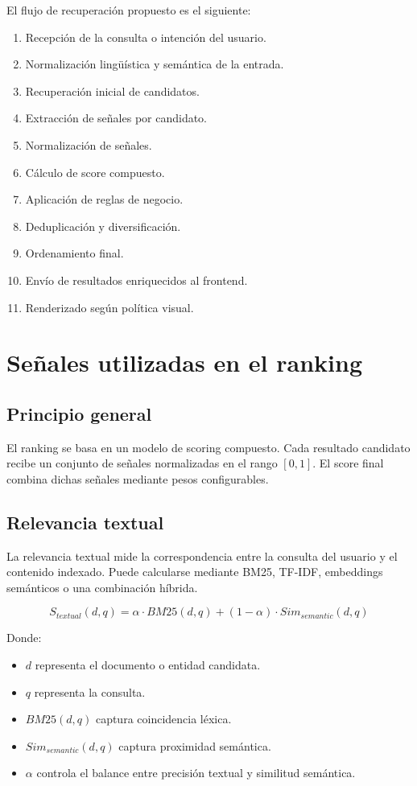 \documentclass[12pt,a4paper]{article}
\begin{document}
El flujo de recuperación propuesto es el siguiente:

\begin{enumerate}[noitemsep]
    \item Recepción de la consulta o intención del usuario.
    \item Normalización lingüística y semántica de la entrada.
    \item Recuperación inicial de candidatos.
    \item Extracción de señales por candidato.
    \item Normalización de señales.
    \item Cálculo de score compuesto.
    \item Aplicación de reglas de negocio.
    \item Deduplicación y diversificación.
    \item Ordenamiento final.
    \item Envío de resultados enriquecidos al frontend.
    \item Renderizado según política visual.
\end{enumerate}

\section{Señales utilizadas en el ranking}

\subsection{Principio general}

El ranking se basa en un modelo de scoring compuesto. Cada resultado candidato recibe un conjunto de señales normalizadas en el rango $[0,1]$. El score final combina dichas señales mediante pesos configurables.

\subsection{Relevancia textual}

La relevancia textual mide la correspondencia entre la consulta del usuario y el contenido indexado. Puede calcularse mediante BM25, TF-IDF, embeddings semánticos o una combinación híbrida.

\[
S_{textual}(d,q) = \alpha \cdot BM25(d,q) + (1-\alpha) \cdot Sim_{semantic}(d,q)
\]

Donde:

\begin{itemize}[noitemsep]
    \item $d$ representa el documento o entidad candidata.
    \item $q$ representa la consulta.
    \item $BM25(d,q)$ captura coincidencia léxica.
    \item $Sim_{semantic}(d,q)$ captura proximidad semántica.
    \item $\alpha$ controla el balance entre precisión textual y similitud semántica.
\end{itemize}
\end{document}
